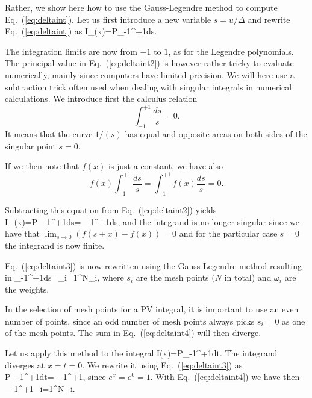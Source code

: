 Rather, we show here how to use the Gauss-Legendre method
to compute Eq.~(\ref{eq:deltaint}). 
Let us first introduce a new variable $s=u/\Delta$ and rewrite
Eq.~(\ref{eq:deltaint}) as   
\be
I_{\Delta}(x)={\cal P}\int_{-1}^{+1}ds.
\label{eq:deltaint2}
\ee

The integration limits are now from $-1$ to $1$, as for the Legendre
polynomials.
The principal value in Eq.~(\ref{eq:deltaint2}) is however rather tricky
to evaluate numerically, mainly since computers have limited
precision. We will here use a subtraction trick often used
when dealing with singular integrals in numerical calculations.
We introduce first the calculus relation
\[
  \int_{-1}^{+1} \frac{ds}{s} =0.
\]
It means that the curve $1/(s)$ has equal and opposite
areas on both sides of the singular point $s=0$. 

If we then note that $f(x)$ is just a constant, we have also
\[
  f(x)\int_{-1}^{+1} \frac{ds}{s}=\int_{-1}^{+1}f(x) \frac{ds}{s} =0.
\]

Subtracting this equation from 
Eq.\ (\ref{eq:deltaint2}) yields
\be
I_{\Delta}(x)={\cal P}\int_{-1}^{+1}ds=\int_{-1}^{+1}ds,
\label{eq:deltaint3}
\ee
and the integrand is no longer singular since we have that 
$\lim_{s \rightarrow 0} (f(s+x) -f(x))=0$ and for the particular case
$s=0$ the integrand 
is now finite.  

Eq.\ (\ref{eq:deltaint3}) is now rewritten using the Gauss-Legendre
method resulting in
\be
\int_{-1}^{+1}ds=\sum_{i=1}^{N}\omega_i,
\label{eq:deltaint4}
\ee
where $s_i$ are the mesh points ($N$ in total) and $\omega_i$ are the weights.

In the selection of mesh points for  a PV integral, it is important
to use an even number of points, since an odd number of mesh
points always picks $s_i=0$ as one of the mesh points. The sum in
Eq.~(\ref{eq:deltaint4}) will then diverge. 


Let us apply this method to the integral
\be
I(x)={\cal P}\int_{-1}^{+1}dt.
\label{eq:deltaint5}
\ee
The integrand diverges at $x=t=0$. We
rewrite it using Eq.~(\ref{eq:deltaint3}) as
\be
{\cal P}\int_{-1}^{+1}dt=\int_{-1}^{+1},
\label{eq:deltaint6}
\ee
since $e^x=e^0=1$. With Eq.~(\ref{eq:deltaint4}) we have then
\be
\int_{-1}^{+1}\approx \sum_{i=1}^{N}\omega_i.
\label{eq:deltaint7}
\ee

